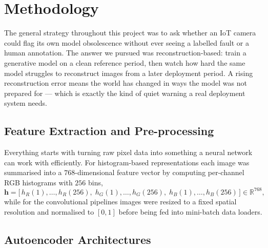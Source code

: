 \section{Methodology}

The general strategy throughout this project was to ask whether an IoT camera could
flag its own model obsolescence without ever seeing a labelled fault or a human
annotation. The answer we pursued was reconstruction-based: train a generative model
on a clean reference period, then watch how hard the same model struggles to
reconstruct images from a later deployment period. A rising reconstruction error means
the world has changed in ways the model was not prepared for --- which is exactly the
kind of quiet warning a real deployment system needs.

\subsection{Feature Extraction and Pre-processing}

Everything starts with turning raw pixel data into something a neural network can work
with efficiently. For histogram-based representations each image was summarised into a
$768$-dimensional feature vector by computing per-channel RGB histograms with $256$
bins,
\begin{equation}
    \mathbf{h} = \bigl[\,h_R(1),\ldots,h_R(256),\;h_G(1),\ldots,h_G(256),\;
                        h_B(1),\ldots,h_B(256)\,\bigr] \in \mathbb{R}^{768},
    \label{eq:histogram}
\end{equation}
while for the convolutional pipelines images were resized to a fixed spatial resolution
and normalised to $[0,1]$ before being fed into mini-batch data loaders.

\subsection{Autoencoder Architectures}

